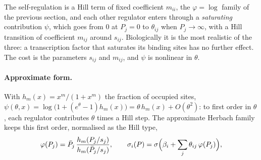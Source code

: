 \documentclass[a4paper, 11pt]{article}
\theoremstyle{plain}
\theoremstyle{remark}
\begin{document}
The self-regulation is a Hill term of fixed coefficient $m_{ii}$, the $\varphi = \log$ family of the previous section, and each other regulator enters through a \emph{saturating} contribution $\psi$, which goes from $0$ at $P_j = 0$ to $\theta_{ij}$ when $P_j \to \infty$, with a Hill transition of coefficient $m_{ij}$ around $s_{ij}$. Biologically it is the most realistic of the three: a transcription factor that saturates its binding sites has no further effect. The cost is the parameters $s_{ij}$ and $m_{ij}$, and $\psi$ is nonlinear in $\theta$.

\paragraph{Approximate form.} With $h_m(x) = x^m/(1 + x^m)$ the fraction of occupied sites, $\psi(\theta, x) = \log\bigl(1 + (e^{\theta} - 1)h_m(x)\bigr) = \theta\,h_m(x) + O(\theta^2)$: to first order in $\theta$, each regulator contributes $\theta$ times a Hill step. The approximate Herbach family keeps this first order, normalised as the Hill type,
\begin{equation}\label{eq:herbach-approx}
\varphi(P_j) = \bar P_j\,\frac{h_m(P_j/s_j)}{h_m(\bar P_j/s_j)}, \qquad \sigma_i(P) = \sigma\Bigl(\beta_i + \sum_j \theta_{ij}\,\varphi(P_j)\Bigr),
\end{equation}
\end{document}

